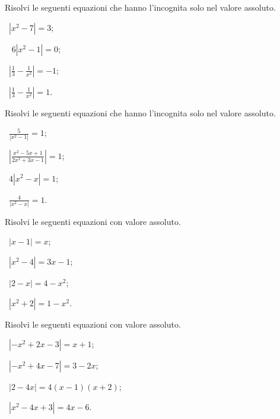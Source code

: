 \begin{esercizio}[\Ast]
 \label{ese:7.6}
Risolvi le seguenti equazioni che hanno l'incognita solo nel valore assoluto.
\begin{multicols}{2}
 \begin{enumeratea}
 \item~$\left|x^2-7\right|=3$;
 \item~ $6\left|x^2-1\right|=0$;
 \item~$\left|\frac 1 3-\frac 1{x^2}\right|=-1$;
 \item~$\left|\frac 1 3-\frac 1{x^2}\right|=1$.
 \end{enumeratea}
 \end{multicols}
\end{esercizio}

\begin{esercizio}[\Ast]
 \label{ese:7.7}
Risolvi le seguenti equazioni che hanno l'incognita solo nel valore assoluto.
\begin{multicols}{2}
 \begin{enumeratea}
 \item~$\frac 5{\left|x^2-1\right|}=1$;
 \item~$\left|\frac{x^2-5x+1}{2x^2+3x-1}\right|=1$;
 \item~$4\left|x^2-x\right|=1$;
 \item~$\frac 4{\left|x^2-x\right|}=1$.
 \end{enumeratea}
 \end{multicols}
\end{esercizio}
\pagebreak
\begin{esercizio}[\Ast]
 \label{ese:7.8}
Risolvi le seguenti equazioni con valore assoluto.
\begin{multicols}{2}
 \begin{enumeratea}
 \item~$\left|x-1\right|=x$;
 \item~$\left|x^2-4\right|=3x-1$;
 \item~$\left|2-x\right|=4-x^2$;
 \item~$\left|x^2+2\right|=1-x^2$.
 \end{enumeratea}
 \end{multicols}
\end{esercizio}

\begin{esercizio}[\Ast]
 \label{ese:7.9}
Risolvi le seguenti equazioni con valore assoluto.
\begin{multicols}{2}
 \begin{enumeratea}
 \item~$\left|-x^2+2x-3\right|=x+1$;
 \item~$\left|-x^2+4x-7\right|=3-2x$;
 \item~$\left|2-4x\right|=4(x-1)(x+2)$;
 \item~$\left|x^2-4x+3\right|=4x-6$.
 \end{enumeratea}
 \end{multicols}
\end{esercizio}

